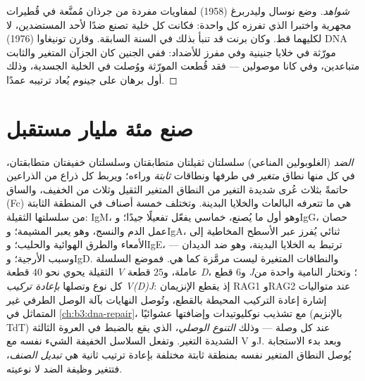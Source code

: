 \begin{proof}[شواهد]
وضع نوسال وليدربرغ (1958) لمفاويات مفردة من جرذان مُمنَّعة
في قُطيرات مجهرية واختبرا  الذي تفرزه كل واحدة: فكانت
كل خلية تصنع ضدًا لأحد المستضدين، لا لكليهما قط. وكان برنت
قد تنبأ بذلك في السنة السابقة. وقارن تونيغاوا (1976) DNA
مورّثة  في خلايا جنينية وفي  مفرز للأضداد: ففي الجنين
كان الجزآن المتغير والثابت متباعدين، وفي  كانا
موصولين --- فقد قُطعت المورّثة ووُصلت في الخلية الجسدية،
وذلك أول برهان على جينوم يُعاد ترتيبه عمدًا.
\end{proof}

\section{صنع مئة مليار مستقبل}

\begin{definition}\label{def:b3:adaptive-immunity:antibody}
\emph{الضد} (الغلوبولين المناعي) سلسلتان ثقيلتان متطابقتان
وسلسلتان خفيفتان متطابقتان، في كل منها نطاق \emph{متغير} في
طرفها ونطاقات \emph{ثابتة} وراءه؛ ويربط كل ذراع من الذراعين
حاتمةً بثلاث عُرى شديدة التغير من النطاق المتغير الثقيل
وثلاث من الخفيف، والساق (Fc) هي ما تتعرفه البالعات 
والخلايا البدينة. وتختلف خمسة أصناف في المنطقة الثابتة من
سلسلتها الثقيلة: IgM، وهو أول ما يُصنع، خماسي يفعّل 
تفعيلًا جيدًا؛ وIgG، حصان عمل الدم والنسج، وهو يعبر
المشيمة؛ وIgA، ثنائي يُفرز عبر الأسطح المخاطية إلى الأمعاء
والطرق الهوائية والحليب؛ وIgE، ترتبط به الخلايا البدينة،
وهو ضد الديدان --- وسبب الأرجية؛ وIgD. والنطاقات المتغيرة
ليست مرمَّزة كما هي. فموضع السلسلة الثقيلة يحوي نحو $40$
قطعة \emph{V} عاملة، و$25$ قطعة \emph{D}، و$6$ قطع \emph{J}؛
وتختار  النامية واحدة من كل نوع وتصلها
\emph{بإعادة تركيب V(D)J}: إذ يقطع الإنزيمان RAG1 وRAG2 عند
متواليات إشارة إعادة التركيب المحيطة بالقطع، وتُوصل النهايات
بآلة الوصل الطرفي غير المتماثل في \cref{ch:b3:dna-repair}،
مع تشذيب نوكليوتيدات وإضافتها عشوائيًا (بالإنزيم TdT) عند
كل وصلة --- وذلك \emph{التنوع الوصلي}، الذي يقع بالضبط في
العروة الثالثة الشديدة التغير. وتفعل السلاسل الخفيفة الشيء
نفسه مع V وJ. وبعد بدء الاستجابة يُوصل النطاق المتغير نفسه
بمنطقة ثابتة مختلفة بإعادة ترتيب ثانية هي \emph{تبديل
الصنف}، فتتغير وظيفة الضد لا نوعيته.
\end{definition}


